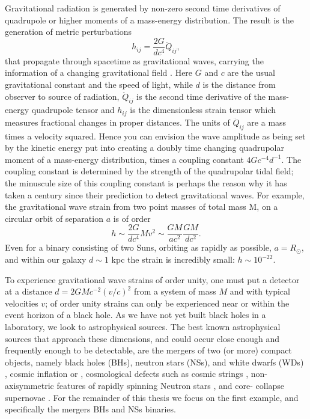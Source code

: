 Gravitational radiation is generated by non-zero second time derivatives of quadrupole or
higher moments of a mass-energy distribution. The result is the generation of
metric perturbations
\begin{equation}  
h_{i j} = \frac{2G}{d c^4}\ddot{Q}_{ij},  
\end{equation}
that propagate through spacetime as gravitational waves, carrying the
information of a changing gravitational field
\citep[\textit{e.g.}]{WaldGR:1984}. Here $G$ and $c$ are the usual gravitational
constant and the speed of light, while $d$ is the distance from observer to
source of radiation, $\ddot{Q}_{ij}$ is the second time derivative of the
mass-energy quadrupole tensor and $h_{ij}$ is the dimensionless strain tensor
which measures fractional changes in proper distances. The units of
$\ddot{Q}_{ij}$ are a mass times a velocity squared. Hence you can envision
the wave amplitude as being set by the kinetic energy put into
creating a doubly time changing quadrupolar moment of a mass-energy distribution, times a
coupling constant $4 Gc^{-4}d^{-1}$. The coupling constant is determined by
the strength of the quadrupolar tidal field; the minuscule size of this
coupling constant is perhaps the reason why it has taken a century since their
prediction to detect gravitational waves. For example, the gravitational wave
strain from two point masses of total mass M, on a circular orbit of
separation $a$ is of order \begin{equation}  h \sim \frac{2G}{d c^4} M v^2
\sim \frac{G M }{a c^2} \frac{G M }{d c^2}.  \label{Eq:BinStrain}
\end{equation} Even for a binary consisting of two Suns, orbiting as rapidly
as possible, $a=R_{\odot}$, and within our galaxy $d \sim 1$ kpc the strain is
incredibly small: $h\sim10^{-22}$.



To experience gravitational wave strains of order unity, one must put a
detector at a distance $d= 2GMc^{-2} (v/c)^2$ from a system of mass $M$ and
with typical velocities $v$; of order unity strains can only be experienced
near or within the event horizon of a black hole.
%
%
As we have not yet built
black holes in a laboratory, we look to astrophysical sources. The best known
astrophysical sources that approach these dimensions, and could occur close
enough and frequently enough to be detectable, are the mergers of two (or
more) compact objects, namely black holes (BHs), neutron stars (NSs), and
white dwarfs (WDs) \citep[\textit{e.g.}][]{ThorneBraginsky:1976,
ClarkeErdley:1977, Belczynski:2016}, cosmic inflation \citep{Starobinski:1979}
or \citep[\textit{e.g.}][for a recent review]{Guzzetti:2016}, cosmological
defects such as cosmic strings \citep[\textit{e.g.}][and references
therein]{Damour:2005},  non-axisymmetric features of rapidly spinning Neutron
stars \citep[\textit{e.g.}][and references therein]{Haskell:2015}, and core-
collapse supernovae \citep[\textit{e.g.}][and references
therein]{FryerNew:2003:LRR}.  For the remainder of this thesis we focus on the
first example, and specifically  the mergers BHs and NSs binaries.

